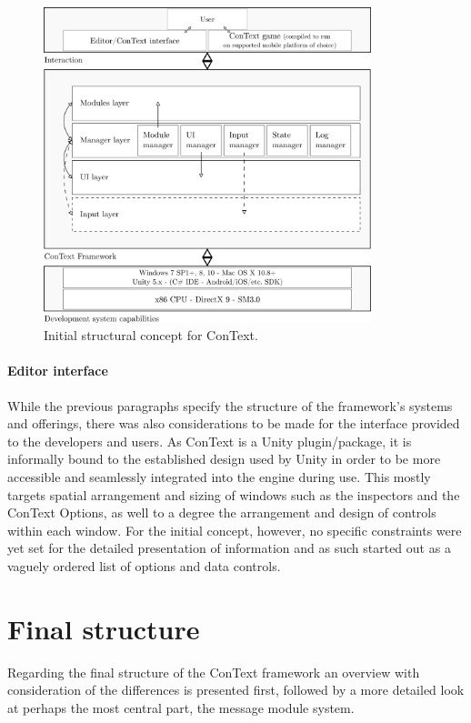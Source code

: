 \begin{figure}[h]
\centering
\includegraphics[width=0.85\textwidth]{figures/concept.png}
\caption[Initial structural concept for ConText]{Initial structural concept for ConText.}\label{fig:concept}
\end{figure}

\paragraph{Editor interface} While the previous paragraphs specify the structure of the framework's systems and offerings, there was also considerations to be made for the interface provided to the developers and users. As ConText is a Unity plugin/package, it is informally bound to the established design used by Unity in order to be more accessible and seamlessly integrated into the engine during use. This mostly targets spatial arrangement and sizing of windows such as the inspectors and the ConText Options, as well to a degree the arrangement and design of controls within each window. For the initial concept, however, no specific constraints were yet set for the detailed presentation of information and as such started out as a vaguely ordered list of options and data controls.

\section{Final structure}
Regarding the final structure of the ConText framework an overview with consideration of the differences is presented first, followed by a more detailed look at perhaps the most central part, the message module system. 
